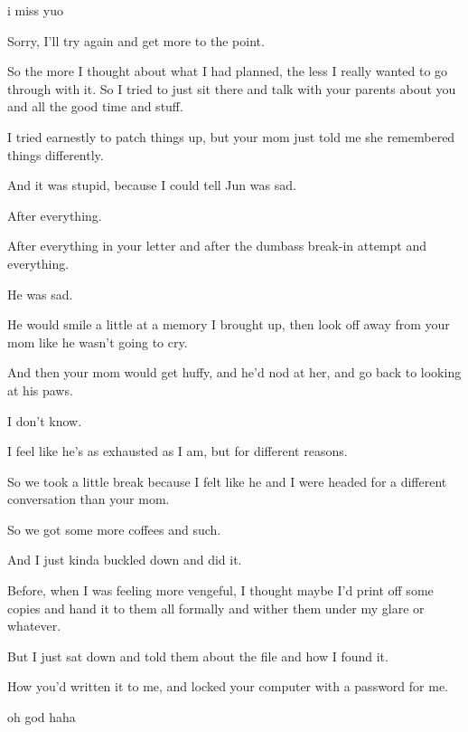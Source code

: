 { i miss yuo

 Sorry, I'll try again and get more to the point.

 So the more I thought about what I had planned, the less I really wanted to go through with it. So I tried to just sit there and talk with your parents about you and all the good time and stuff.

 I tried earnestly to patch things up, but your mom just told me she remembered things differently.

 And it was stupid, because I could tell Jun was sad.

 After everything.

 After everything in your letter and after the dumbass break-in attempt and everything.

 He was sad.

 He would smile a little at a memory I brought up, then look off away from your mom like he wasn't going to cry.

 And then your mom would get huffy, and he'd nod at her, and go back to looking at his paws.

 I don't know.

 I feel like he's as exhausted as I am, but for different reasons.

 So we took a little break because I felt like he and I were headed for a different conversation than your mom.

 So we got some more coffees and such.

 And I just kinda buckled down and did it.

 Before, when I was feeling more vengeful, I thought maybe I'd print off some copies and hand it to them all formally and wither them under my glare or whatever.

 But I just sat down and told them about the file and how I found it.

 How you'd written it to me, and locked your computer with a password for me.

 oh god haha

}
